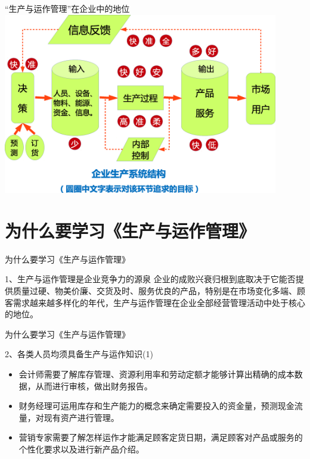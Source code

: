 \documentclass[11pt]{beamer}
\begin{document}
	\begin{frame}{“生产与运作管理”在企业中的地位}
		\includegraphics[width=0.9\textwidth]{img/生产系统结构}
	\end{frame}
	
	\section{为什么要学习《生产与运作管理》}
	\begin{frame}{为什么要学习《生产与运作管理》}
		\begin{block}{1、生产与运作管理是企业竞争力的源泉}
			企业的成败兴衰归根到底取决于它能否提供质量过硬、物美价廉、交货及时、服务优良的产品，特别是在市场变化多端、顾客需求越来越多样化的年代，生产与运作管理在企业全部经营管理活动中处于核心的地位。
		\end{block}		
	\end{frame}	
	
	\begin{frame}{为什么要学习《生产与运作管理》}
		\begin{block}{2、各类人员均须具备生产与运作知识(1)}
			\begin{itemize}
				\item 会计师需要了解库存管理、资源利用率和劳动定额才能够计算出精确的成本数据，从而进行审核，做出财务报告。
				\item 财务经理可运用库存和生产能力的概念来确定需要投入的资金量，预测现金流量，对现有资产进行管理。
				\item 营销专家需要了解怎样运作才能满足顾客定货日期，满足顾客对产品或服务的个性化要求以及进行新产品介绍。
			\end{itemize}  
		\end{block}		
	\end{frame}	
	
\end{document}
